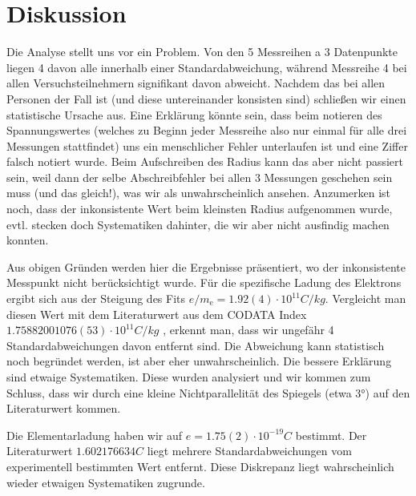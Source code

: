 \section{Diskussion}
Die Analyse stellt uns vor ein Problem. Von den 5 Messreihen a 3 Datenpunkte liegen 4 davon alle innerhalb einer Standardabweichung, während Messreihe 4 bei allen Versuchsteilnehmern signifikant davon abweicht. Nachdem das bei allen Personen der Fall ist (und diese untereinander konsisten sind) schließen wir einen statistische Ursache aus. Eine Erklärung könnte sein, dass beim notieren des Spannungswertes (welches zu Beginn jeder Messreihe also nur einmal für alle drei Messungen stattfindet) uns ein menschlicher Fehler unterlaufen ist und eine Ziffer falsch notiert wurde. Beim Aufschreiben des Radius kann das aber nicht passiert sein, weil dann der selbe Abschreibfehler bei allen 3 Messungen geschehen sein muss (und das gleich!), was wir als unwahrscheinlich ansehen. Anzumerken ist noch, dass der inkonsistente Wert beim kleinsten Radius aufgenommen wurde, evtl. stecken doch Systematiken dahinter, die wir aber nicht ausfindig machen konnten. 

Aus obigen Gründen werden hier die Ergebnisse präsentiert, wo der inkonsistente Messpunkt nicht berücksichtigt wurde. Für die spezifische Ladung des Elektrons ergibt sich aus der Steigung des Fits \( e/m_{\text{e}} = 1.92(4) \cdot 10^{11} \unit{C/kg} \). Vergleicht man diesen Wert mit dem Literaturwert aus dem CODATA Index \( 1.758 820 010 76 (53) \cdot 10^{11} \unit{C/kg} \) \cite{codata}, erkennt man, dass wir ungefähr 4 Standardabweichungen davon entfernt sind. Die Abweichung kann statistisch noch begründet werden, ist aber eher unwahrscheinlich. Die bessere Erklärung sind etwaige Systematiken. Diese wurden analysiert und wir kommen zum Schluss, dass wir durch eine kleine Nichtparallelität des Spiegels (etwa \( \ang{3} \)) auf den Literaturwert kommen. 

Die Elementarladung haben wir auf \( e = 1.75(2) \cdot 10^{-19} \unit{C} \) bestimmt. Der Literaturwert \( 1.602 176 634 \unit{C} \) \cite{codata} liegt mehrere Standardabweichungen vom experimentell bestimmten Wert entfernt. Diese Diskrepanz liegt wahrscheinlich wieder etwaigen Systematiken zugrunde. 

